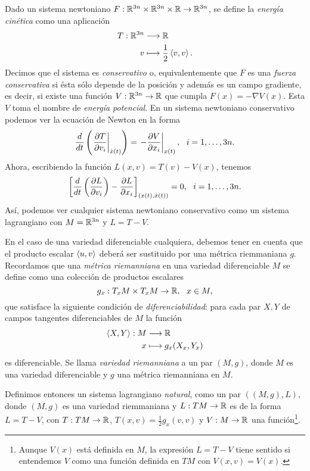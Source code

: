  Dado un sistema newtoniano $F:\mathbb{R}^{3n}\times\mathbb{R}^{3n}\times\mathbb{R} \rightarrow \mathbb{R}^{3n}$, se define la \emph{energía cinética} como una aplicación
  \begin{align*}
    T: \mathbb{R}^{3n} & \longrightarrow \mathbb{R} \\
    v & \longmapsto \frac{1}{2}\left\langle v,v\right\rangle.
  \end{align*}
  Decimos que el sistema es \emph{conservativo} o, equivalentemente que $F$ es una \emph{fuerza conservativa} si ésta sólo depende de la posición y además es un campo gradiente, es decir, si existe una función $V:\mathbb{R}^{3n}\rightarrow \mathbb{R}$ que cumpla $F(x)=-\nabla V(x)$. Esta $V$ toma el nombre de \emph{energía potencial}.
  En un sistema newtoniano conservativo podemos ver la ecuación de Newton en la forma
  \begin{equation*}
    \frac{d}{dt} \left( \left. \parcial{T}{v_i} \right|_{\dot{x}(t)} \right) = \left.-\parcial{V}{x_i}\right|_{x(t)}, \ \ i=1,\dots,3n.
  \end{equation*}
  Ahora, escribiendo la función $L(x,v)=T(v)-V(x)$, tenemos
  \begin{equation*}
    \left[\frac{d}{dt}\left( \frac{\partial L}{\partial v_i} \right) - \frac{\partial L}{\partial x_i}\right]_{(x(t),\dot{x}(t))} = 0, \ \  i=1,\dots,3n.
  \end{equation*}
  Así, podemos ver cualquier sistema newtoniano conservativo como un sistema lagrangiano con $M=\mathbb{R}^{3n}$ y $L=T-V$.

  En el caso de una variedad diferenciable cualquiera, debemos tener en cuenta que el producto escalar $\left\langle u,v\right\rangle$ deberá ser sustituido por una métrica riemmaniana $g$. Recordamos que una \emph{métrica riemanniana} en una variedad diferenciable $M$ se define como una colección de productos escalares
  \begin{equation*}
    g_x: T_xM \times T_xM \rightarrow \mathbb{R}, \ \ x\in M,  
  \end{equation*}
  que satisface la siguiente condición de \emph{diferenciabilidad}: para cada par $X,Y$ de campos tangentes diferenciables de $M$ la función
  \begin{align*}
    \left\langle X,Y\right\rangle: M & \longrightarrow \mathbb{R} \\
    x & \longmapsto g_x(X_x,Y_x)
  \end{align*}
  es diferenciable. Se llama \emph{variedad riemanniana} a un par $(M,g)$, donde $M$ es una variedad diferenciable y $g$ una métrica riemanniana en $M$.
  
  Definimos entonces un sistema lagrangiano \emph{natural}, como un par $\left( (M,g), L \right)$, donde $(M,g)$ es una variedad riemmaniana y $L:TM \rightarrow \mathbb{R}$ es de la forma $L=T-V$, con $T:TM \rightarrow \mathbb{R}$, $T(x,v)=\frac{1}{2}g_x(v,v)$ y $V: M \rightarrow \mathbb{R}$ una función\footnote{Aunque $V(x)$ está definida en $M$, la expresión $L=T-V$ tiene sentido si entendemos $V$ como una función definida en $TM$ con $V(x,v)=V(x)$.}.

